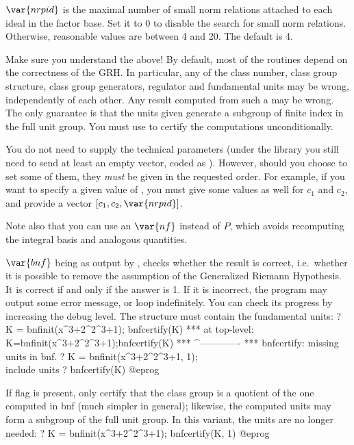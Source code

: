 $\var{nrpid}$ is the maximal number of small norm relations attached to each
ideal in the factor base. Set it to $0$ to disable the search for small norm
relations. Otherwise, reasonable values are between 4 and 20. The default is
4.

 Make sure you understand the above! By default, most of
the  routines depend on the correctness of the GRH. In particular,
any of the class number, class group structure, class group generators,
regulator and fundamental units may be wrong, independently of each other.
Any result computed from such a  may be wrong. The only guarantee is
that the units given generate a subgroup of finite index in the full unit
group. You must use  to certify the computations
unconditionally.


You do not need to supply the technical parameters (under the library you
still need to send at least an empty vector, coded as ). However,
should you choose to set some of them, they \emph{must} be given in the
requested order. For example, if you want to specify a given value of
, you must give some values as well for $c_1$ and $c_2$, and provide
a vector $[c_1,c_2,\var{nrpid}]$.

Note also that you can use an $\var{nf}$ instead of $P$, which avoids
recomputing the integral basis and analogous quantities.

\smallskip


\label{se:bnfcertify}
$\var{bnf}$ being as output by
, checks whether the result is correct, i.e.~whether it is
possible to remove the assumption of the Generalized Riemann
Hypothesis. It is correct if and only if the answer is 1. If it is
incorrect, the program may output some error message, or loop indefinitely.
You can check its progress by increasing the debug level. The 
structure must contain the fundamental units:
\bprog
? K = bnfinit(x^3+2^2^3+1); bnfcertify(K)
  ***   at top-level: K=bnfinit(x^3+2^2^3+1);bnfcertify(K)
  ***                                        ^-------------
  *** bnfcertify: missing units in bnf.
? K = bnfinit(x^3+2^2^3+1, 1); \\ include units
? bnfcertify(K)
@eprog

If flag is present, only certify that the class group is a quotient of the
one computed in bnf (much simpler in general); likewise, the computed units
may form a subgroup of the full unit group. In this variant, the units are
no longer needed:
\bprog
? K = bnfinit(x^3+2^2^3+1); bnfcertify(K, 1)
@eprog

